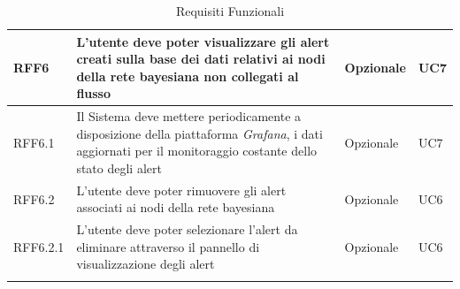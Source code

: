 \begin{center}
\begin{longtable}[c]{|m{}|m{}|m{}|m{}|}
\rowcolor{grigio}RFF6 & L'utente deve poter visualizzare gli alert creati sulla base dei dati relativi ai nodi della rete bayesiana non collegati al flusso & Opzionale & UC7\\ 
\hline
RFF6.1 & Il Sistema deve mettere periodicamente a disposizione della piattaforma \textit{Grafana}, i dati aggiornati per il monitoraggio costante dello stato degli alert & Opzionale & UC7\\
\hline
\rowcolor{grigio}RFF6.2 & L'utente deve poter rimuovere gli alert associati ai nodi della rete bayesiana & Opzionale & UC6\\
\hline
RFF6.2.1 & L'utente deve poter selezionare l'alert da eliminare attraverso il pannello di visualizzazione degli alert & Opzionale & UC6\\
\hline
\caption{Requisiti Funzionali}
\end{longtable}
\end{center}



